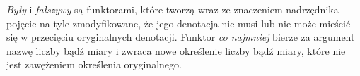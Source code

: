 \documentclass[a4paper, 12pt]{article}
\theoremstyle{remark}
\begin{document}
\emph{Były} i \emph{fałszywy} są funktorami, które tworzą wraz ze znaczeniem nadrzędnika pojęcie na tyle zmodyfikowane, że jego denotacja nie musi lub nie może mieścić się w przecięciu oryginalnych denotacji.
Funktor \emph{co najmniej} bierze za argument nazwę liczby bądź miary i zwraca nowe określenie liczby bądź miary, które nie jest zawężeniem określenia oryginalnego.






\end{document}
